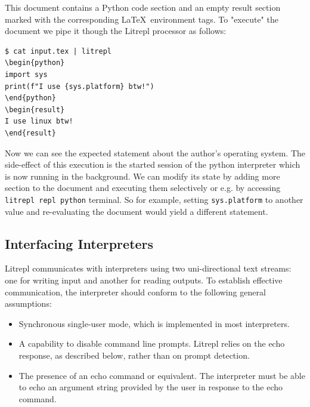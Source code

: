 \documentclass[letterpaper,12pt,twocolumn]{article}
\newcommand{\Latex}{\LaTeX\ }
\begin{document}
This document contains a Python code section and an empty result section marked
with the corresponding \Latex environment tags. To "execute" the document we
pipe it though the Litrepl processor as follows:

\begin{verbatim}
$ cat input.tex | litrepl
\begin{python}
import sys
print(f"I use {sys.platform} btw!")
\end{python}
\begin{result}
I use linux btw!
\end{result}
\end{verbatim}

Now we can see the expected statement about the author's operating system.  The
side-effect of this execution is the started session of the python interpreter
which is now running in the background. We can modify its state by adding more
section to the document and executing them selectively or e.g. by accessing
\verb|litrepl repl python| terminal. So for example, setting \verb|sys.platform|
to another value and re-evaluating the document would yield a different
statement.


\subsection{Interfacing Interpreters}

Litrepl communicates with interpreters using two uni-directional text streams:
one for writing input and another for reading outputs. To establish effective
communication, the interpreter should conform to the following general
assumptions:

\begin{itemize}
  \item Synchronous single-user mode, which is implemented in most interpreters.
  \item A capability to disable command line prompts. Litrepl relies on the echo
        response, as described below, rather than on prompt detection.
  \item The presence of an echo command or equivalent. The interpreter must be
        able to echo an argument string provided by the user in response to the
        echo command.
\end{itemize}
\end{document}
